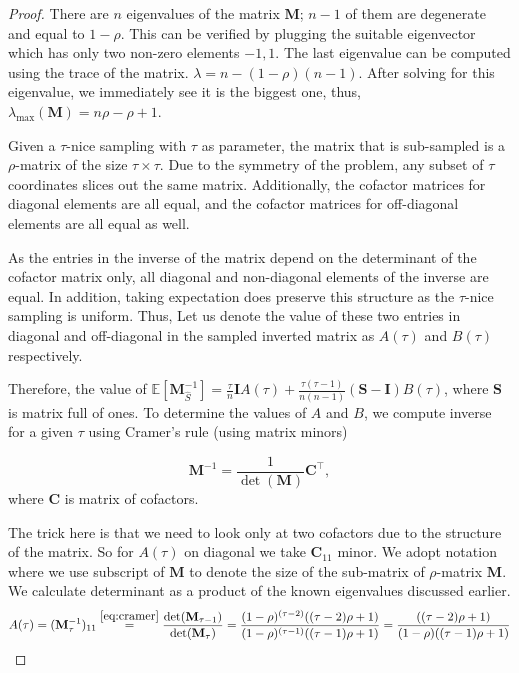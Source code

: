 \documentclass[11pt]{article}
\newcommand{\bI}{\mathbf{I}}
\newcommand{\bM}{\mathbf{M}}
\begin{document}
	\begin{proof}
		There are $n$ eigenvalues of the matrix $\mathbf{M}$; $n-1$ of them are degenerate and equal to $1-\rho$. This can be verified by plugging the suitable eigenvector which has only two non-zero elements ${-1,1}$. The last eigenvalue can be computed using the trace of the matrix. $\lambda=n-(1-\rho)(n-1)$. After solving for this eigenvalue, we immediately see it is the biggest one, thus, $\lambda_{\max}(\mathbf{M})=n\rho-\rho+1$.
		
		Given a $\tau$-nice sampling with $\tau$ as parameter, the matrix that is sub-sampled is a $\rho$-matrix of the size $\tau \times \tau$. Due to the symmetry of the problem, any subset of $\tau$ coordinates slices out the same matrix. Additionally, the cofactor matrices for diagonal elements are all equal, and the cofactor matrices for off-diagonal elements are all equal as well.
		
		As the entries in the inverse of the matrix depend on the determinant of the cofactor matrix only, all diagonal and non-diagonal elements of the inverse are equal. In addition, taking expectation does preserve this structure as the $\tau$-nice sampling is uniform. Thus, Let us denote the value of these two entries in diagonal and off-diagonal in the sampled inverted matrix as $A(\tau)$ and $B(\tau)$ respectively.
		
		Therefore, the value of $\mathbb{E}[\mathbf{M}_{\hat{S}}^{-1}]=\frac{\tau}{n}\bI	A(\tau)+\frac{\tau(\tau-1)}{n(n-1)}(\mathbf{S}-\bI)B(\tau)$, where $\mathbf{S}$ is matrix full of ones. To determine the values of $A$ and $B$, we compute inverse for a given $\tau$ using Cramer's rule (using matrix minors)
		
		\begin{equation}\label{eq:cramer}
			\bM^{-1}=\frac{1}{\det(\bM)}\mathbf{C}^\top,
		\end{equation}
		where $\mathbf{C}$ is matrix of cofactors. 
		
		The trick here is that we need to look only at two cofactors due to the structure of the matrix. So for $A(\tau)$ on diagonal we take $\mathbf{C}_{11}$ minor. We adopt notation where we use subscript of $\mathbf{M}$ to denote the size of the sub-matrix of $\rho$-matrix $\mathbf{M}$. We calculate determinant as a product of the known eigenvalues discussed earlier. 
		\begin{equation*}
			A(\tau)=(\mathbf{M}_{\tau}^{-1})_{11}\stackrel{\eqref{eq:cramer}}=\frac{\det(\mathbf{M}_{\tau-1})}{\det(\mathbf{M}_{\tau})}=\frac{(1-\rho)^{(\tau-2)}((\tau-2)\rho+1)}{(1-\rho)^{(\tau-1)}((\tau-1)\rho+1)}=\frac{((\tau-2)\rho+1)}{(1-\rho)((\tau-1)\rho+1)} 
		\end{equation*}
		

\end{proof}
\end{document}
